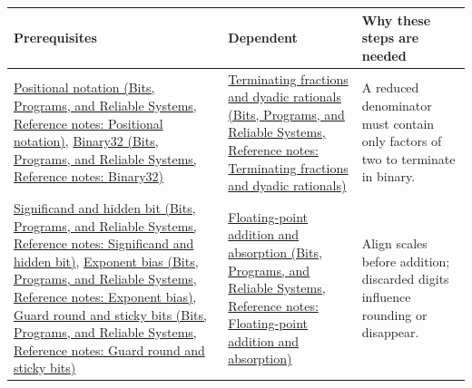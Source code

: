 \hypertarget{appendix-4ad47bdd269a-m005---arithmetic-error-and-reproducibility-learning-spine}{}

{\def\LTcaptype{none} %
\begin{longtable}[]{@{}
  >{\raggedright\arraybackslash}p{}
  >{\raggedright\arraybackslash}p{}
  >{\raggedright\arraybackslash}p{}@{}}
\toprule\noalign{}
\begin{minipage}[b]{\linewidth}\raggedright
Prerequisites
\end{minipage} & \begin{minipage}[b]{\linewidth}\raggedright
Dependent
\end{minipage} & \begin{minipage}[b]{\linewidth}\raggedright
Why these steps are needed
\end{minipage} \\
\midrule\noalign{}
\endhead
\bottomrule\noalign{}
\endlastfoot
\href{../01-Bits-Programs-and-Reliable-Systems/main.pdf\#nameddest=appendix-83c3f28f7bda}{Positional notation (Bits, Programs, and Reliable Systems, Reference notes: Positional notation)}, \href{../01-Bits-Programs-and-Reliable-Systems/main.pdf\#nameddest=appendix-5057f9ad327f}{Binary32 (Bits, Programs, and Reliable Systems, Reference notes: Binary32)} & \href{../01-Bits-Programs-and-Reliable-Systems/main.pdf\#nameddest=appendix-2a2f1b74bdd3}{Terminating fractions and dyadic rationals (Bits, Programs, and Reliable Systems, Reference notes: Terminating fractions and dyadic rationals)} & A reduced denominator must contain only factors of two to terminate in binary. \\
\href{../01-Bits-Programs-and-Reliable-Systems/main.pdf\#nameddest=appendix-a24fd710cf67}{Significand and hidden bit (Bits, Programs, and Reliable Systems, Reference notes: Significand and hidden bit)}, \href{../01-Bits-Programs-and-Reliable-Systems/main.pdf\#nameddest=appendix-2fae058c82e1}{Exponent bias (Bits, Programs, and Reliable Systems, Reference notes: Exponent bias)}, \href{../01-Bits-Programs-and-Reliable-Systems/main.pdf\#nameddest=appendix-b572b631069b}{Guard round and sticky bits (Bits, Programs, and Reliable Systems, Reference notes: Guard round and sticky bits)} & \href{../01-Bits-Programs-and-Reliable-Systems/main.pdf\#nameddest=appendix-a1b1b4580dfd}{Floating-point addition and absorption (Bits, Programs, and Reliable Systems, Reference notes: Floating-point addition and absorption)} & Align scales before addition; discarded digits influence rounding or disappear. \\

\end{longtable}}
